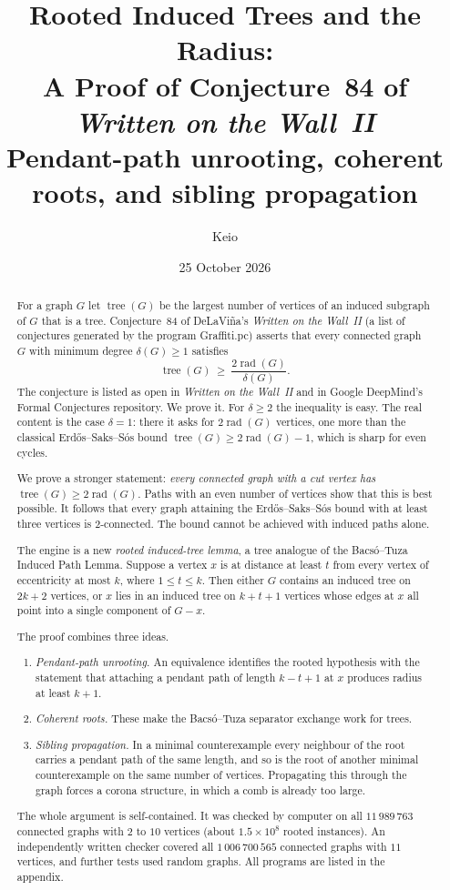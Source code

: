 \documentclass[11pt,a4paper]{article}
\title{\bfseries Rooted Induced Trees and the Radius:\\ A Proof of Conjecture~84 of \emph{Written on the Wall~II}\\[6pt]
\large Pendant-path unrooting, coherent roots, and sibling propagation}
\author{Keio}
\date{25 October 2026}
\theoremstyle{definition}
\newcommand{\rad}{\operatorname{rad}}
\newcommand{\tr}{\operatorname{tree}}
\begin{document}
\maketitle

\begin{abstract}
For a graph $G$ let $\tr(G)$ be the largest number of vertices of an induced subgraph of $G$ that is a tree. Conjecture~84 of DeLaVi\~na's \emph{Written on the Wall~II} (a list of conjectures generated by the program Graffiti.pc) asserts that every connected graph $G$ with minimum degree $\delta(G)\ge 1$ satisfies
\[
\tr(G)\ \ge\ \frac{2\rad(G)}{\delta(G)} .
\]
The conjecture is listed as open in \emph{Written on the Wall~II} and in Google DeepMind's Formal Conjectures repository. We prove it. For $\delta\ge2$ the inequality is easy. The real content is the case $\delta=1$: there it asks for $2\rad(G)$ vertices, one more than the classical Erd\H{o}s--Saks--S\'os bound $\tr(G)\ge 2\rad(G)-1$, which is sharp for even cycles.

We prove a stronger statement: \emph{every connected graph with a cut vertex has $\tr(G)\ge 2\rad(G)$}. Paths with an even number of vertices show that this is best possible. It follows that every graph attaining the Erd\H{o}s--Saks--S\'os bound with at least three vertices is $2$-connected. The bound cannot be achieved with induced paths alone.

The engine is a new \emph{rooted induced-tree lemma}, a tree analogue of the Bacs\'o--Tuza Induced Path Lemma. Suppose a vertex $x$ is at distance at least $t$ from every vertex of eccentricity at most $k$, where $1\le t\le k$. Then either $G$ contains an induced tree on $2k+2$ vertices, or $x$ lies in an induced tree on $k+t+1$ vertices whose edges at $x$ all point into a single component of $G-x$.

The proof combines three ideas.
\begin{enumerate}
\item \emph{Pendant-path unrooting.} An equivalence identifies the rooted hypothesis with the statement that attaching a pendant path of length $k-t+1$ at $x$ produces radius at least $k+1$.
\item \emph{Coherent roots.} These make the Bacs\'o--Tuza separator exchange work for trees.
\item \emph{Sibling propagation.} In a minimal counterexample every neighbour of the root carries a pendant path of the same length, and so is the root of another minimal counterexample on the same number of vertices. Propagating this through the graph forces a corona structure, in which a comb is already too large.
\end{enumerate}
The whole argument is self-contained. It was checked by computer on all $11\,989\,763$ connected graphs with $2$ to $10$ vertices (about $1.5\times10^{8}$ rooted instances). An independently written checker covered all $1\,006\,700\,565$ connected graphs with $11$ vertices, and further tests used random graphs. All programs are listed in the appendix.
\end{abstract}
\end{document}
